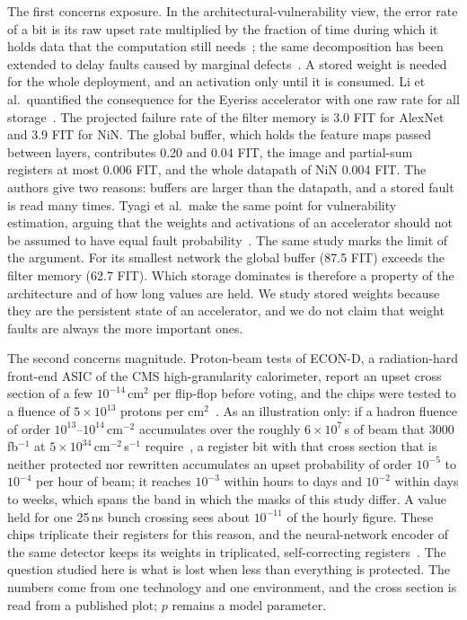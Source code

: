 The first concerns exposure. In the architectural-vulnerability view, the error rate of a bit is its raw upset rate multiplied by the fraction of time during which it holds data that the computation still needs~\cite{mukherjee2003avf}; the same decomposition has been extended to delay faults caused by marginal defects~\cite{deutsch2024delayavf}. A stored weight is needed for the whole deployment, and an activation only until it is consumed. Li et al.\ quantified the consequence for the Eyeriss accelerator with one raw rate for all storage~\cite{li2017understanding}. The projected failure rate of the filter memory is 3.0 FIT for AlexNet and 3.9 FIT for NiN. The global buffer, which holds the feature maps passed between layers, contributes 0.20 and 0.04 FIT, the image and partial-sum registers at most 0.006 FIT, and the whole datapath of NiN 0.004 FIT. The authors give two reasons: buffers are larger than the datapath, and a stored fault is read many times. Tyagi et al.\ make the same point for vulnerability estimation, arguing that the weights and activations of an accelerator should not be assumed to have equal fault probability~\cite{tyagi2023thales}. The same study marks the limit of the argument. For its smallest network the global buffer (87.5 FIT) exceeds the filter memory (62.7 FIT). Which storage dominates is therefore a property of the architecture and of how long values are held. We study stored weights because they are the persistent state of an accelerator, and we do not claim that weight faults are always the more important ones.

The second concerns magnitude. Proton-beam tests of ECON-D, a radiation-hard front-end ASIC of the CMS high-granularity calorimeter, report an upset cross section of a few $10^{-14}$\,cm$^2$ per flip-flop before voting, and the chips were tested to a fluence of $5\times10^{13}$ protons per cm$^2$~\cite{cummings2023econd}. As an illustration only: if a hadron fluence of order $10^{13}$--$10^{14}$\,cm$^{-2}$ accumulates over the roughly $6\times10^{7}$\,s of beam that 3000\,fb$^{-1}$ at $5\times10^{34}$\,cm$^{-2}$\,s$^{-1}$ require~\cite{hllhc2017tdr}, a register bit with that cross section that is neither protected nor rewritten accumulates an upset probability of order $10^{-5}$ to $10^{-4}$ per hour of beam; it reaches $10^{-3}$ within hours to days and $10^{-2}$ within days to weeks, which spans the band in which the masks of this study differ. A value held for one 25\,ns bunch crossing sees about $10^{-11}$ of the hourly figure. These chips triplicate their registers for this reason, and the neural-network encoder of the same detector keeps its weights in triplicated, self-correcting registers~\cite{diguglielmo2021reconfigurable}. The question studied here is what is lost when less than everything is protected. The numbers come from one technology and one environment, and the cross section is read from a published plot; $p$ remains a model parameter.

